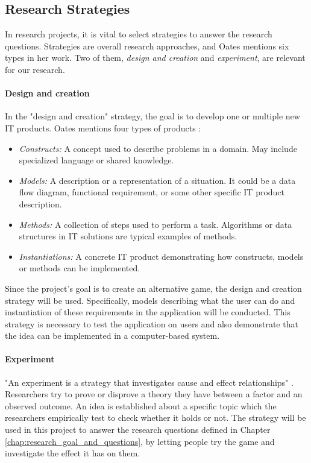 \subsection{Research Strategies}
In research projects, it is vital to select strategies to answer the research questions. Strategies are overall research approaches, and Oates mentions six types in her work. Two of them, \textit{design and creation} and \textit{experiment}, are relevant for our research.

\paragraph*{Design and creation}
In the "design and creation" strategy, the goal is to develop one or multiple new IT products. Oates mentions four types of products \citep{march_design_1995}:
\begin{itemize}
    \item \textit{Constructs:} A concept used to describe problems in a domain. May include specialized language or shared knowledge.
    \item \textit{Models:} A description or a representation of a situation. It could be a data flow diagram, functional requirement, or some other specific IT product description.
    \item \textit{Methods:} A collection of steps used to perform a task. Algorithms or data structures in IT solutions are typical examples of methods.
    \item \textit{Instantiations:} A concrete IT product demonstrating how constructs, models or methods can be implemented.
\end{itemize}

Since the project’s goal is to create an alternative game, the design and creation strategy will be used. Specifically, models describing what the user can do and instantiation of these requirements in the application will be conducted. This strategy is necessary to test the application on users and also demonstrate that the idea can be implemented in a computer-based system.

\paragraph*{Experiment}
"An experiment is a strategy that investigates cause and effect relationships" \citep{oates_researching_2006}. Researchers try to prove or disprove a theory they have between a factor and an observed outcome. An idea is established about a specific topic which the researchers empirically test to check whether it holds or not. The strategy will be used in this project to answer the research questions defined in Chapter \ref{chap:research_goal_and_questions}, by letting people try the game and investigate the effect it has on them.

